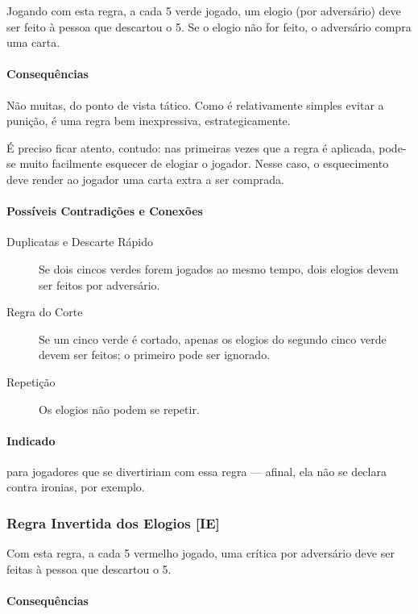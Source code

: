 Jogando com esta regra, a cada 5 verde jogado, um elogio (por adversário) deve ser feito à pessoa que descartou o 5. Se o elogio não for feito, o adversário compra uma carta.

\paragraph{Consequências}

Não muitas, do ponto de vista tático. Como é relativamente simples evitar a punição, é uma regra bem inexpressiva, estrategicamente.

É preciso ficar atento, contudo: nas primeiras vezes que a regra é aplicada, pode-se muito facilmente esquecer de elogiar o jogador. Nesse caso, o esquecimento deve render ao jogador uma carta extra a ser comprada.

\paragraph{Possíveis Contradições e Conexões}

\begin{description}
\item[Duplicatas e Descarte Rápido]{Se dois cincos verdes forem jogados ao mesmo tempo, dois elogios devem ser feitos por adversário.}
\item[Regra do Corte]{Se um cinco verde é cortado, apenas os elogios do segundo cinco verde devem ser feitos; o primeiro pode ser ignorado.}
\item[Repetição]{Os elogios não podem se repetir.}
\end{description}

\paragraph{Indicado} 

para jogadores que se divertiriam com essa regra --- afinal, ela não se declara contra ironias, por exemplo.

\subsubsection{Regra Invertida dos Elogios [IE]}

Com esta regra, a cada 5 vermelho jogado, uma crítica por adversário deve ser feitas à pessoa que descartou o 5.

\paragraph{Consequências}

